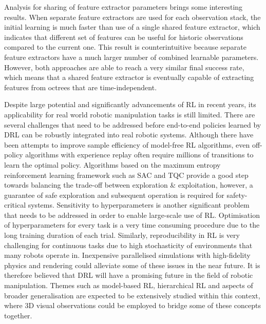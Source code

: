 Analysis for sharing of feature extractor parameters brings some interesting results. When separate feature extractors are used for each observation stack, the initial learning is much faster than use of a single shared feature extractor, which indicates that different set of features can be useful for historic observations compared to the current one. This result is counterintuitive because separate feature extractors have a much larger number of combined learnable parameters. However, both approaches are able to reach a very similar final success rate, which means that a shared feature extractor is eventually capable of extracting features from octrees that are time-independent.

Despite large potential and significantly advancements of RL in recent years, its applicability for real world robotic manipulation tasks is still limited. There are several challenges that need to be addressed before end-to-end policies learned by DRL can be robustly integrated into real robotic systems. Although there have been attempts to improve sample efficiency of model-free RL algorithms, even off-policy algorithms with experience replay often require millions of transitions to learn the optimal policy. Algorithms based on the maximum entropy reinforcement learning framework such as SAC and TQC provide a good step towards balancing the trade-off between exploration \& exploitation, however, a guarantee of safe exploration and subsequent operation is required for safety-critical systems. Sensitivity to hyperparameters is another significant problem that needs to be addressed in order to enable large-scale use of RL. Optimisation of hyperparameters for every task is a very time consuming procedure due to the long training duration of each trial. Similarly, reproducibility in RL is very challenging for continuous tasks due to high stochasticity of environments that many robots operate in. Inexpensive parallelised simulations with high-fidelity physics and rendering could alleviate some of these issues in the near future. It is therefore believed that DRL will have a promising future in the field of robotic manipulation. Themes such as model-based RL, hierarchical RL and aspects of broader generalisation are expected to be extensively studied within this context, where 3D visual observations could be employed to bridge some of these concepts together.
